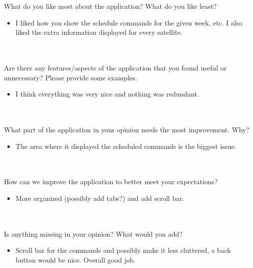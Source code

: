 \documentclass[12pt, titlepage]{article}
\begin{document}
What do you like most about the application? What do you like least?

\begin{itemize}
    \item I liked how you show the schedule commands for the given week, etc. I also liked the extra information displayed for every satellite.
\end{itemize}

\\ \\

Are there any features/aspects of the application that you found useful or unnecessary? Please provide some examples. 

\begin{itemize}
    \item I think everything was very nice and nothing was redundant.
\end{itemize}

\\ \\

What part of the application in your opinion needs the most improvement. Why?

\begin{itemize}
    \item The area where it displayed the scheduled commands is the biggest issue.
\end{itemize}

\\ \\

How can we improve the application to better meet your expectations? 

\begin{itemize}
    \item More organized (possibly add tabs?) and add scroll bar.
\end{itemize}

\\ \\

Is anything missing in your opinion? What would you add? 

\begin{itemize}
    \item Scroll bar for the commands and possibly make it less cluttered, a back button would be nice. Overall good job.
\end{itemize}
\end{document}
